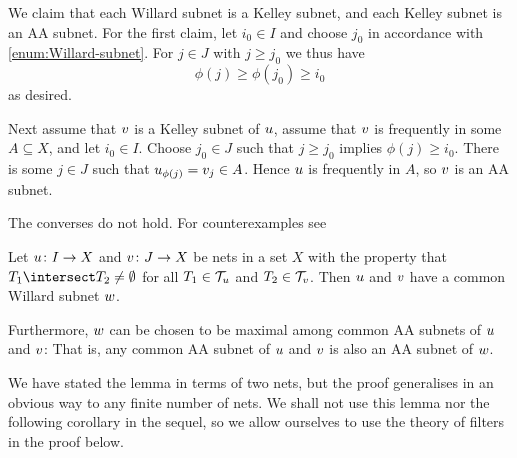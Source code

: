 \documentclass[article, a4paper, 11pt, oneside]{memoir}
\numberwithin{equation}{chapter}
\newcommand{\calE}{\mathcal{E}}
\theoremstyle{nonumberplain}
\begin{document}
\begin{remarkbreak}
    We claim that each Willard subnet is a Kelley subnet, and each Kelley subnet is an AA subnet. For the first claim, let $i_0 \in I$ and choose $j_0$ in accordance with \cref{enum:Willard-subnet}. For $j \in J$ with $j \geq j_0$ we thus have
    \begin{equation*}
        \phi(j)
            \geq \phi(j_0)
            \geq i_0
    \end{equation*}
    as desired.

    Next assume that $v$ is a Kelley subnet of $u$, assume that $v$ is frequently in some $A \subseteq X$, and let $i_0 \in I$. Choose $j_0 \in J$ such that $j \geq j_0$ implies $\phi(j) \geq i_0$. There is some $j \in J$ such that $u_{\phi(j)} = v_j \in A$. Hence $u$ is frequently in $A$, so $v$ is an AA subnet.

    The converses do not hold. For counterexamples see \textcite[§7.16]{schechter1997} %
\end{remarkbreak}

\begin{lemma}
    \label{thm:Willard-subnet}
    Let $u \colon I \to X$ and $v \colon J \to X$ be nets in a set $X$ with the property that $T_1 \intersect T_2 \neq \emptyset$ for all $T_1 \in \mathcal{T}_{u}$ and $T_2 \in \mathcal{T}_{v}$. Then $u$ and $v$ have a common Willard subnet $w$.

    Furthermore, $w$ can be chosen to be maximal among common AA subnets of $u$ and $v$: That is, any common AA subnet of $u$ and $v$ is also an AA subnet of $w$.
\end{lemma}
%
We have stated the lemma in terms of two nets, but the proof generalises in an obvious way to any finite number of nets. We shall not use this lemma nor the following corollary in the sequel, so we allow ourselves to use the theory of filters in the proof below.

\newcommand{\evfilt}[1][]{\calE_{#1}}
\newcommand{\evfilteq}[1][]{\tilde{\calE}_{#1}}
\end{document}
